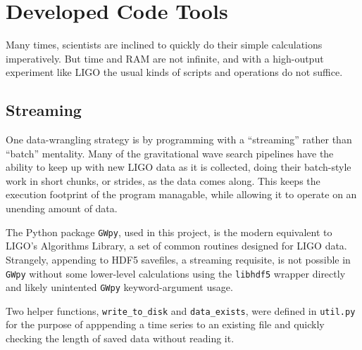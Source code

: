 \documentclass[colorlinks=true,pdfstartview=FitV,linkcolor=blue,
            citecolor=red,urlcolor=magenta]{ligodoc}
\begin{document}
\section{Developed Code Tools}
Many times, scientists are inclined to quickly do their simple calculations imperatively.
But time and RAM are not infinite, and with a high-output experiment like LIGO the usual kinds of scripts and operations do not suffice.
\subsection{Streaming}
One data-wrangling strategy is by programming with a ``streaming'' rather than ``batch'' mentality.
Many of the gravitational wave search pipelines have the ability to keep up with new LIGO data as it is collected, doing their batch-style work in short chunks, or strides, as the data comes along.
This keeps the execution footprint of the program managable, while allowing it to operate on an unending amount of data.

The Python package \texttt{GWpy}, used in this project, is the modern equivalent to LIGO's Algorithms Library, a set of common routines designed for LIGO data.
Strangely, appending to HDF5 savefiles, a streaming requisite, is not possible in \texttt{GWpy} without some lower-level calculations using the \texttt{libhdf5} wrapper directly and likely unintented \texttt{GWpy} keyword-argument usage.

Two helper functions, \texttt{write\_to\_disk} and \texttt{data\_exists}, were defined in \texttt{util.py} for the purpose of apppending a time series to an existing file and quickly checking the length of saved data without reading it.
\end{document}
